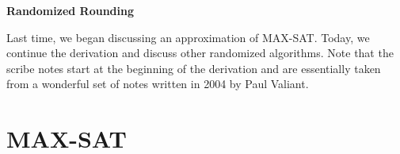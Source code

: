 \documentclass{article}
\begin{document}
%


%
%
%
%

%




\begin{center}
{\large \bf Randomized Rounding}
\end{center}

Last time, we began discussing an approximation of MAX-SAT. Today, we continue the derivation and discuss other randomized algorithms. Note that the scribe notes start at the beginning of the derivation and are essentially taken from a wonderful set of notes written in 2004 by Paul Valiant.

\section{MAX-SAT}
\end{document}
